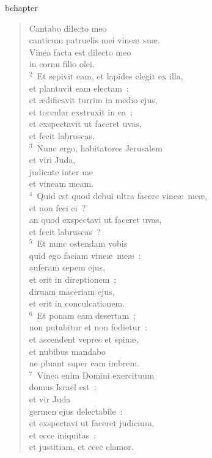 bchapter\begin{verse}\vspace{-19pt}Cantabo dilecto meo\\ canticum patruelis mei vine\ae\ su\ae .\\ Vinea facta est dilecto meo\\ in cornu filio olei.\\
${}^{2}$~Et sepivit eam, et lapides elegit ex illa,\\ et plantavit eam electam~;\\ et \ae dificavit turrim in medio ejus,\\ et torcular exstruxit in ea~;\\ et exspectavit ut faceret uvas,\\ et fecit labruscas.\\
${}^{3}$~Nunc ergo, habitatores Jerusalem\\ et viri Juda,\\ judicate inter me\\ et vineam meam.\\
${}^{4}$~Quid est quod debui ultra facere vine\ae\ me\ae ,\\ et non feci ei~?\\ an quod exspectavi ut faceret uvas,\\ et fecit labruscas~?\\
${}^{5}$~Et nunc ostendam vobis\\ quid ego faciam vine\ae\ me\ae~:\\ auferam sepem ejus,\\ et erit in direptionem~;\\ diruam maceriam ejus,\\ et erit in conculcationem.\\
${}^{6}$~Et ponam eam desertam~;\\ non putabitur et non fodietur~:\\ et ascendent vepres et spin\ae ,\\ et nubibus mandabo\\ ne pluant super eam imbrem.\\
${}^{7}$~Vinea enim Domini exercituum\\ domus Isra\"el est~;\\ et vir Juda\\ germen ejus delectabile~:\\ et exspectavi ut faceret judicium,\\ et ecce iniquitas~;\\ et justitiam, et ecce clamor.\end{verse}


